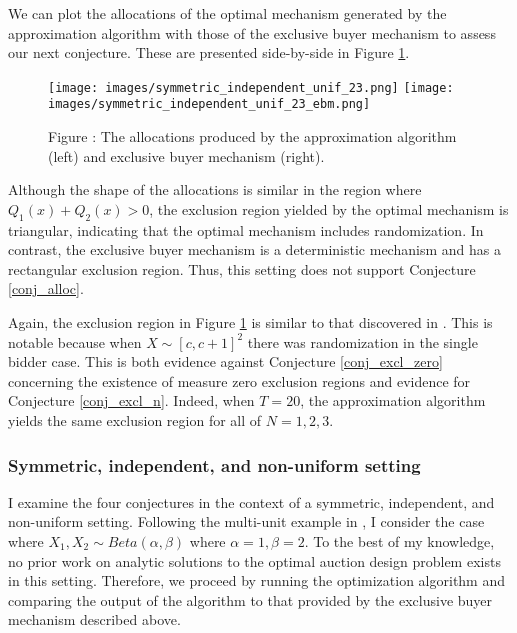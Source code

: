 We can plot the allocations of the optimal mechanism generated by the approximation algorithm with those of the exclusive buyer mechanism to assess our next conjecture. These are presented side-by-side in Figure \ref{fig:pavlov_n2_23_alloc}.

\begin{figure}[H]
    \begin{center}
    \texttt{[image: images/symmetric\_independent\_unif\_23.png]}
    \texttt{[image: images/symmetric\_independent\_unif\_23\_ebm.png]}
    \end{center}
    
    \vspace{1mm}
    \raggedright{\small {\sc Figure \thefig\label{fig:pavlov_n2_23_alloc}:} The allocations produced by the approximation algorithm (left) and exclusive buyer mechanism (right).} 
\end{figure}

\noindent Although the shape of the allocations is similar in the region where $Q_1(x) + Q_2(x) > 0$, the exclusion region yielded by the optimal mechanism is triangular, indicating that the optimal mechanism includes randomization. In contrast, the exclusive buyer mechanism is a deterministic mechanism and has a rectangular exclusion region. Thus, this setting does not support Conjecture \ref{conj_alloc}.

Again, the exclusion region in Figure \ref{fig:pavlov_n2_23_alloc} is similar to that discovered in \autocite{pavlov2011optimal}. This is notable because when $X \sim [c,c+1]^2$ there was randomization in the single bidder case. This is both evidence against Conjecture \ref{conj_excl_zero} concerning the existence of measure zero exclusion regions and evidence for Conjecture \ref{conj_excl_n}. Indeed, when $T=20$, the approximation algorithm yields the same exclusion region for all of $N=1,2,3$.





\subsubsection{Symmetric, independent, and non-uniform setting}

I examine the four conjectures in the context of a symmetric, independent, and non-uniform setting. Following the multi-unit example in \autocite{daskalakis2017strong}, I consider the case where $X_1,X_2 \sim Beta(\alpha,\beta)$ where $\alpha=1,\beta=2$. To the best of my knowledge, no prior work on analytic solutions to the optimal auction design problem exists in this setting. Therefore, we proceed by running the optimization algorithm and comparing the output of the algorithm to that provided by the exclusive buyer mechanism described above.

